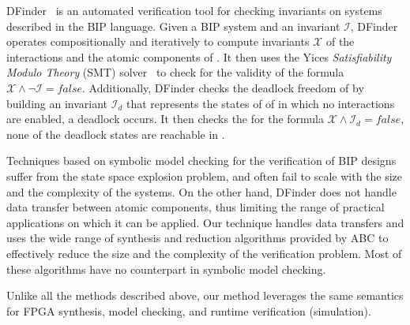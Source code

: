DFinder~\cite{dfinder} is an automated verification tool for checking invariants
on systems described in the BIP language. Given a BIP system \Pm and 
an invariant $\mathcal{I}$, DFinder operates  compositionally and iteratively
to compute invariants $\mathcal{X}$ of the interactions and the atomic 
components of \Pm. It then uses the Yices {\em Satisfiability Modulo
Theory} (SMT) solver~\cite{dutertre2006fast} to check for the validity 
of the formula $\mathcal{X} \land \lnot \mathcal{I} = false$. 
Additionally, DFinder checks the deadlock freedom of  \Pm by building an invariant 
$\mathcal{I}_d$ that represents the states of of \Pm in which no interactions 
are enabled, \ie{} a deadlock occurs. It then checks the for the formula
$\mathcal{X} \land \mathcal{I}_d = false$, \ie{} none of the deadlock states
are reachable in \Pm.   

Techniques based on symbolic model checking for the verification of 
BIP designs suffer from the state space explosion problem, and often 
fail to scale with the size and the complexity of the systems. 
On the other hand, DFinder does not handle data transfer between 
atomic components, thus limiting the range of practical applications 
on which it can be applied. 
Our technique handles data transfers and uses the wide range of synthesis 
and reduction algorithms provided by ABC to effectively reduce the size and 
the complexity of the verification problem. Most of these algorithms have no counterpart
in symbolic model checking.  

Unlike all the methods described above, our method leverages
the same semantics for FPGA synthesis, model checking, 
and runtime verification (simulation). 
